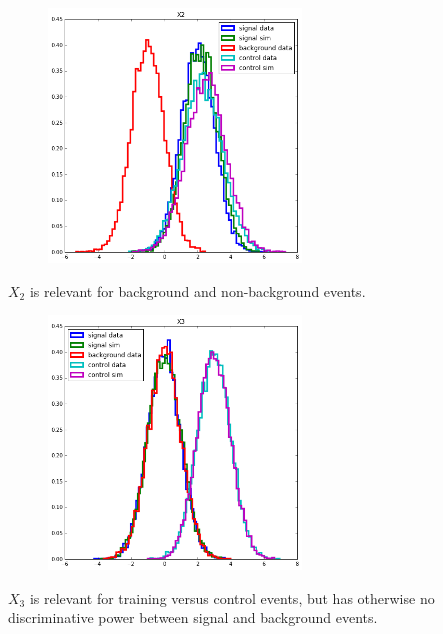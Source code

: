 \documentclass{beamer}
\begin{document}
\begin{frame}

\begin{figure}
\centering
\includegraphics[width=0.6\textwidth]{x2.png}
\end{figure}

$X_2$ is {\color{blue} relevant} for  background and non-background events.

\end{frame}


\begin{frame}

\begin{figure}
\centering
\includegraphics[width=0.6\textwidth]{x3.png}
\end{figure}

$X_3$ is relevant for training versus control events, but has otherwise no
discriminative power between signal and background events.

\end{frame}
\end{document}
